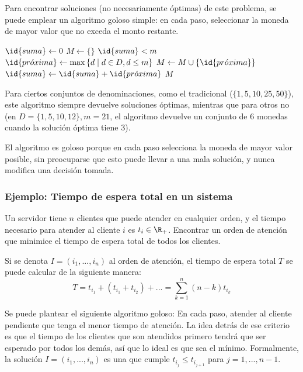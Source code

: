 Para encontrar soluciones (no necesariamente óptimas) de este problema, se puede emplear un algoritmo goloso simple: en cada paso, seleccionar la moneda de mayor valor que no exceda el monto restante.

\begin{codebox}
    \li $\id{suma} \gets 0$
    \li $M \gets \{\}$
    \li \While $\id{suma} < m$ \Do
    \li $\id{pr\acute{o}xima} \gets \max{\{d \mid d \in D, d \leq m\}}$
    \li $M \gets M \cup \{\id{pr\acute{o}xima\}}$
    \li $\id{suma} \gets \id{suma} + \id{pr\acute{o}xima}$
    \End
    \li \Return $M$
\end{codebox}

Para ciertos conjuntos de denominaciones, como el tradicional ($\{1, 5, 10, 25, 50\}$), este algoritmo siempre devuelve soluciones óptimas, mientras que para otros no (en $D = \{1, 5, 10, 12\}, m = 21$, el algoritmo devuelve un conjunto de $6$ monedas cuando la solución óptima tiene $3$).

El algoritmo es goloso porque en cada paso selecciona la moneda de mayor valor posible, sin preocuparse que esto puede llevar a una mala solución, y nunca modifica una decisión tomada.

\subsubsection{Ejemplo: Tiempo de espera total en un sistema}

\begin{problema}
    Un servidor tiene $n$ clientes que puede atender en cualquier orden, y el tiempo necesario para atender al cliente $i$ es $t_i \in \R_+$. Encontrar un orden de atención que minimice el tiempo de espera total de todos los clientes.
\end{problema}

Si se denota $I = (i_1, ..., i_n)$ al orden de atención, el tiempo de espera total $T$ se puede calcular de la siguiente manera:
$$T = t_{i_1} + (t_{i_1} + t_{i_2}) + ... = \sum_{k=1}^n (n - k) t_{i_k}$$

Se puede plantear el siguiente algoritmo goloso: En cada paso, atender al cliente pendiente que tenga el menor tiempo de atención. La idea detrás de ese criterio es que el tiempo de los clientes que son atendidos primero tendrá que ser esperado por todos los demás, así que lo ideal es que sea el mínimo. Formalmente, la solución $I = (i_1, ..., i_n)$ es una que cumple $t_{i_j} \leq t_{i_{j+1}}$ para $j = 1, ..., n - 1$.

